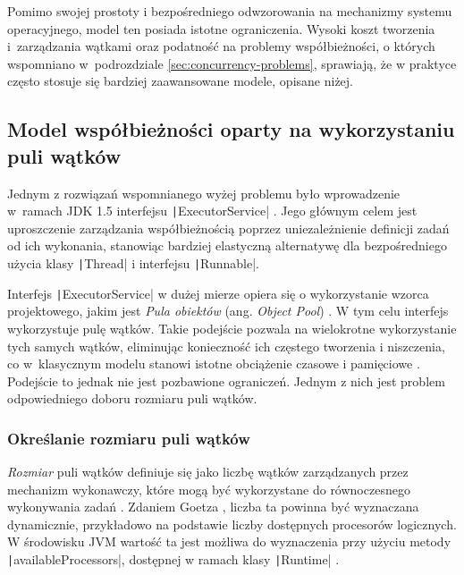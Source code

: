 Pomimo swojej prostoty i bezpośredniego odwzorowania na mechanizmy systemu operacyjnego, model ten posiada istotne ograniczenia. Wysoki koszt tworzenia i~zarządzania wątkami oraz podatność na problemy współbieżności, o których wspomniano w~podrozdziale \ref{sec:concurrency-problems}, sprawiają, że w praktyce często stosuje się bardziej zaawansowane modele, opisane niżej.

\subsection{Model współbieżności oparty na wykorzystaniu puli wątków}
Jednym z rozwiązań wspomnianego wyżej problemu było wprowadzenie w~ramach JDK 1.5 interfejsu \texttt|ExecutorService| \cite{java-executor-service}. Jego głównym celem jest uproszczenie zarządzania współbieżnością poprzez uniezależnienie definicji zadań od ich wykonania, stanowiąc bardziej elastyczną alternatywę dla bezpośredniego użycia klasy \texttt|Thread| i interfejsu \texttt|Runnable|.

Interfejs \texttt|ExecutorService| w dużej mierze opiera się o wykorzystanie wzorca projektowego, jakim jest \emph{Pula obiektów} (ang. \emph{Object Pool}) \cite{bain2020}. W tym celu interfejs wykorzystuje pulę wątków. Takie podejście pozwala na wielokrotne wykorzystanie tych samych wątków, eliminując konieczność ich częstego tworzenia i niszczenia, co w~klasycznym modelu stanowi istotne obciążenie czasowe i pamięciowe \cite{veen2024}. Podejście to jednak nie jest pozbawione ograniczeń. Jednym z nich jest problem odpowiedniego doboru rozmiaru puli wątków.

\subsubsection{Określanie rozmiaru puli wątków}

\emph{Rozmiar} puli wątków definiuje się jako liczbę wątków zarządzanych przez mechanizm wykonawczy, które mogą być wykorzystane do równoczesnego wykonywania zadań \cite{java-threadpoolexecutor}. Zdaniem Goetza \cite{goetz2006}, liczba ta powinna być wyznaczana dynamicznie, przykładowo na podstawie liczby dostępnych procesorów logicznych. W środowisku JVM wartość ta jest możliwa do wyznaczenia przy użyciu metody \texttt|availableProcessors|, dostępnej w ramach klasy \texttt|Runtime| \cite{java-runtime}.

